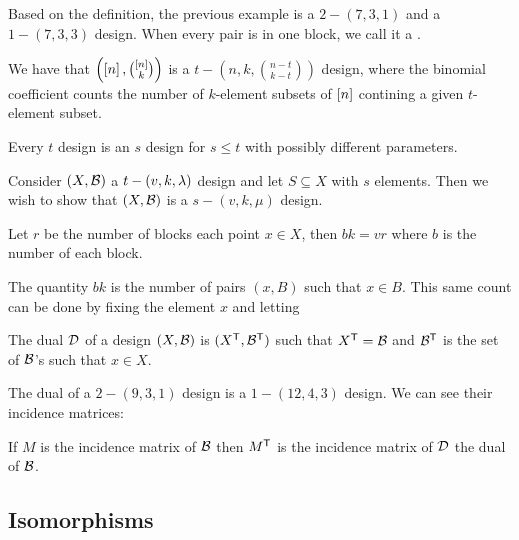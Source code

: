 \documentclass[12pt]{memoir}
\begin{document}
Based on the definition, the previous example is a $2-(7,3,1)$ and a $1-(7,3,3)$ design. When every pair is in one block, we call it a .

\begin{Ex}
    We have that $\left(\left\lbrack n\right\rbrack,\binom{\left\lbrack n\right\rbrack}{k}\right)$ is a $t-\left(n,k,\binom{n-t}{k-t}\right)$ design, where the binomial coefficient counts the number of $k$-element subsets of $\left\lbrack n\right\rbrack$ contining a given $t$-element subset.
\end{Ex}

\begin{Lem}
    Every $t$ design is an $s$ design for $s\leq t$ with possibly different parameters.
\end{Lem}

\begin{ptcbp}
    Consider $(X,\mathcal{B})$ a $t-(v,k,\lambda)$ design and let $S\subseteq X$ with $s$ elements. Then we wish to show that $(X,\mathcal{B})$ is a $s-(v,k,\mu)$ design. 
\end{ptcbp}

\begin{Lem}
    Let $r$ be the number of blocks each point $x\in X$, then $bk=vr$ where $b$ is the number of each block.
\end{Lem}

\begin{ptcbp}
    The quantity $bk$ is the number of pairs $(x,B)$ such that $x\in B$. This same count can be done by fixing the element $x$ and letting 
\end{ptcbp}
    
\begin{Def}
    The dual $\mathcal{D}$ of a design $(X,\mathcal{B})$ is $(X^{\mathsf{T}},\mathcal{B}^{\mathsf{T}})$ such that $X^{\mathsf{T}}=\mathcal{B}$ and $\mathcal{B}^{\mathsf{T}}$ is the set of $\mathcal{B}$'s such that $x\in X$.
\end{Def}

\begin{Ex}
    The dual of a $2-(9,3,1)$ design is a $1-(12,4,3)$ design. We can see their incidence matrices: 
\end{Ex}

\begin{Lem}
    If $M$ is the incidence matrix of $\mathcal{B}$ then $M^{\mathsf{T}}$ is the incidence matrix of $\mathcal{D}$ the dual of $\mathcal{B}$.
\end{Lem}

\subsection{Isomorphisms}
\end{document}
